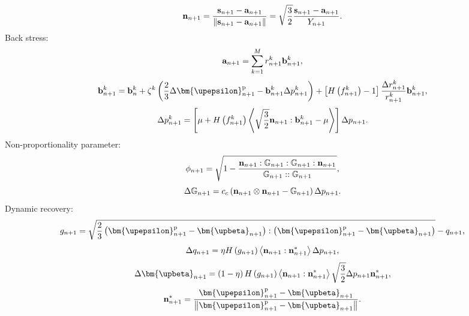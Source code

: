 \begin{equation}
\label{Equ:nn+1}
{{\bf{n}}_{n + 1}} = \frac{{{{\bf{s}}_{n + 1}} - {{\bf{a}}_{n + 1}}}}{{\left\| {{{\bf{s}}_{n + 1}} - {{\bf{a}}_{n + 1}}} \right\|}} = \sqrt {\frac{3}{2}} \frac{{{{\bf{s}}_{n + 1}} - {{\bf{a}}_{n + 1}}}}{{{Y_{n + 1}}}}.
\end{equation}
Back stress:
\begin{equation}
\label{Equ:an+1}
{{\bf{a}}_{n + 1}} = \sum\limits_{k = 1}^M {r_{n + 1}^k{\bf{b}}_{n + 1}^k},
\end{equation}
\begin{equation}
{{\bf{b}}_{n + 1}^k = {\bf{b}}_n^k + {\zeta ^k}\left( {\frac{2}{3}\Delta {\bm{\upepsilon }}_{n + 1}^{\rm{p}} - {\bf{b}}_{n + 1}^k\Delta p_{n + 1}^k} \right) + \left[ {H\left( {f_{n + 1}^k} \right) - 1} \right]{\frac{{\Delta r_{n + 1}^k}}{{r_{n + 1}^k}}{\bf{b}}_{n + 1}^k}},
\end{equation}
\begin{equation}
\Delta p_{n + 1}^k = \left[ {\mu  + H\left( {f_{n + 1}^k} \right)\left\langle {\sqrt {\frac{3}{2}} {{\bf{n}}_{n + 1}}:{\bf{b}}_{n + 1}^k - \mu } \right\rangle } \right]\Delta {p_{n + 1}}.
\end{equation}
Non-proportionality parameter:
\begin{equation}
{\phi _{n + 1}} = \sqrt {1 - \frac{{{{\bf{n}}_{n + 1}}:{\mathbb{G}_{n + 1}}:{\mathbb{G}_{n + 1}}:{{\bf{n}}_{n + 1}}}}{{{\mathbb{G}_{n + 1}}::{\mathbb{G}_{n + 1}}}}},
\end{equation}
\begin{equation}
\Delta {\mathbb{G}_{n + 1}} = {c_c}\left( {{{\bf{n}}_{n + 1}} \otimes {{\bf{n}}_{n + 1}} - {\mathbb{G}_{n + 1}}} \right)\Delta {p_{n + 1}}.
\end{equation}
Dynamic recovery:
\begin{equation}
{g_{n + 1}} = \sqrt {\frac{2}{3}\left( {{\bm{\upepsilon }}_{n + 1}^{\rm{p}} - {{\bm{\upbeta }}_{n + 1}}} \right):\left( {{\bm{\upepsilon }}_{n + 1}^{\rm{p}} - {{\bm{\upbeta }}_{n + 1}}} \right)}  - {q_{n + 1}},
\end{equation}
\begin{equation}
\Delta {q_{n + 1}} = \eta H\left( {{g_{n + 1}}} \right)\left\langle {{{\bf{n}}_{n + 1}}:{\bf{n}}_{n + 1}^*} \right\rangle \Delta {p_{n + 1}},
\end{equation}
\begin{equation}
\Delta {{\bm{\upbeta }}_{n + 1}} = \left( {1 - \eta } \right)H\left( {{g_{n + 1}}} \right)\left\langle {{{\bf{n}}_{n + 1}}:{\bf{n}}_{n + 1}^*} \right\rangle \sqrt {\frac{3}{2}} \Delta {p_{n + 1}}{\bf{n}}_{n + 1}^*,
\end{equation}
\begin{equation}
{\bf{n}}_{n + 1}^* = \frac{{{\bm{\upepsilon }}_{n + 1}^{\rm{p}} - {{\bm{\upbeta }}_{n + 1}}}}{{\left\| {{\bm{\upepsilon }}_{n + 1}^{\rm{p}} - {{\bm{\upbeta }}_{n + 1}}} \right\|}}.
\end{equation}

